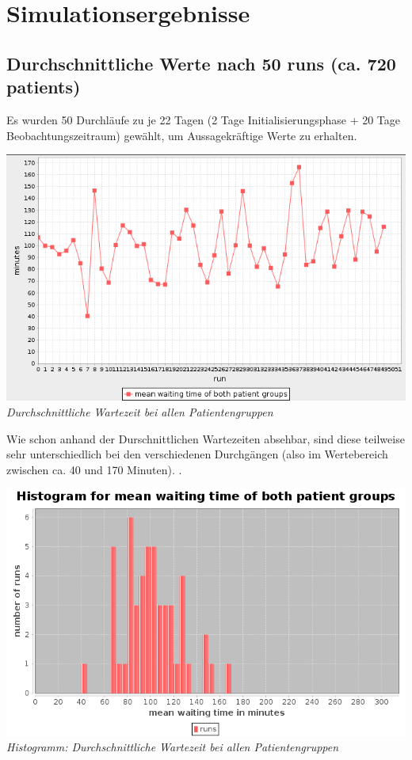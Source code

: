 \documentclass{article}
\begin{document}
\section{Simulationsergebnisse}
\subsection{Durchschnittliche Werte nach 50 runs (ca. 720 patients)}
Es wurden 50 Durchläufe zu je 22 Tagen (2 Tage Initialisierungsphase + 20 Tage Beobachtungszeitraum) gewählt, um Aussagekräftige Werte zu erhalten.\\
\begin{center}
\includegraphics[scale=0.35]{img/avg_waiting.png}\\
\textit{Durchschnittliche Wartezeit bei allen Patientengruppen}\\
\end{center}
Wie schon anhand der Durschnittlichen Wartezeiten absehbar, sind diese teilweise sehr unterschiedlich bei den verschiedenen Durchgängen (also im Wertebereich zwischen ca. 40 und 170 Minuten).
.\\
\begin{center}
\includegraphics[scale=0.4]{img/avg_wait_histogram.png}\\
\textit{Histogramm: Durchschnittliche Wartezeit bei allen Patientengruppen}\\
\end{center}
\end{document}
